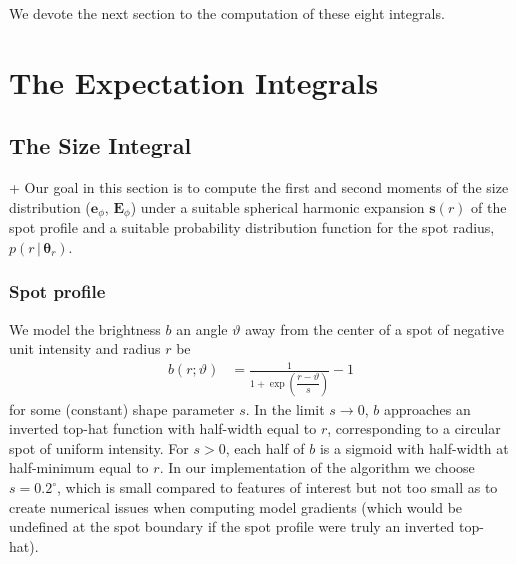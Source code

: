 \documentclass[modern]{aastex62}
\begin{document}
We devote the next section to the computation of these eight
integrals.

\section{The Expectation Integrals}
\label{sec:integrals}
\subsection{The Size Integral}
\label{sec:size}+
%
Our goal in this section is to compute the first and second moments
of the size distribution ($\mathbf{e}_\phi$, $\mathbf{E}_\phi$) under
a suitable spherical harmonic expansion $\mathbf{s}(r)$ of the spot profile
and a suitable probability distribution function for the spot radius,
$p(r \, \big| \, \pmb{\theta}_{r})$.

\subsubsection{Spot profile}
%
We model the brightness $b$ an angle $\vartheta$ away from the
center of a spot of negative unit intensity and radius $r$ be
%
\begin{align}
    \label{eq:brvartheta}
    b(r; \vartheta) & = \frac{1}{1 + \exp\left(\dfrac{r-\vartheta}{s}\right)} - 1
\end{align}
%
for some (constant) shape parameter $s$. In the limit $s \rightarrow 0$, $b$ approaches an
inverted top-hat function with half-width equal to $r$,
corresponding to a circular spot of uniform intensity. For $s > 0$, each half
of $b$ is a sigmoid with half-width at half-minimum equal to $r$.
In our implementation of the algorithm we choose $s = 0.2^\circ$,
which is small compared to features of interest but not too small as to
create numerical issues when computing model gradients (which would be
undefined at the spot boundary if the spot profile were truly an inverted top-hat).
\end{document}
